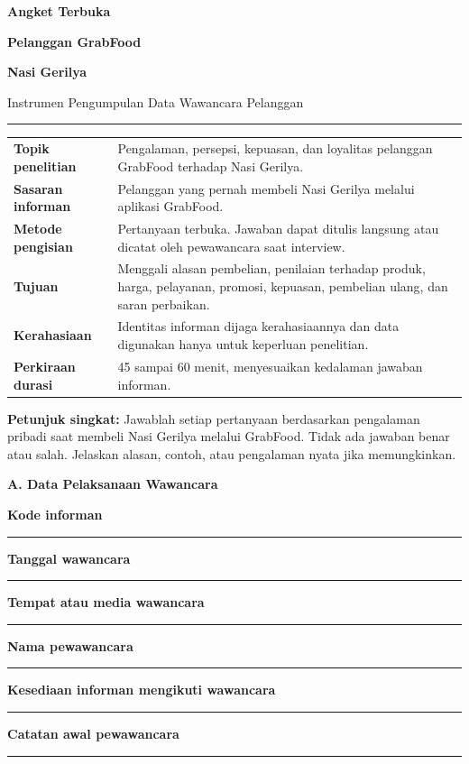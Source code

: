 \documentclass[11pt,a4paper]{article}
\newcommand{\sectionbar}[1]{%
  \Needspace{4\baselineskip}
  \vspace{5mm}
  \noindent\colorbox{Soft}{%
    \parbox{\dimexpr\linewidth-2\fboxsep\relax}{%
      \large\bfseries\textcolor{Primary}{#1}
    }%
  }\par\vspace{2mm}
}
\newcommand{\widefield}[1]{%
  \Needspace{4\baselineskip}
  \textbf{#1}\par
  \noindent\textcolor{LineGray}{\rule{\linewidth}{0.35pt}}\par\vspace{4mm}
}
\begin{document}
\begin{titlepage}
\thispagestyle{empty}
\vspace*{10mm}
{\Huge\bfseries\textcolor{Primary}{Angket Terbuka}}\par
{\Huge\bfseries\textcolor{Primary}{Pelanggan GrabFood}}\par
{\Huge\bfseries\textcolor{Primary}{Nasi Gerilya}}\par
\vspace{3mm}
{\Large\textcolor{Accent}{Instrumen Pengumpulan Data Wawancara Pelanggan}}\par
\vspace{7mm}
\textcolor{Accent}{\rule{0.92\linewidth}{1.4pt}}\par
\vspace{10mm}

\begin{tabularx}{\linewidth}{>{\bfseries\color{Primary}}p{37mm} Y}
Topik penelitian & Pengalaman, persepsi, kepuasan, dan loyalitas pelanggan GrabFood terhadap Nasi Gerilya.\\
Sasaran informan & Pelanggan yang pernah membeli Nasi Gerilya melalui aplikasi GrabFood.\\
Metode pengisian & Pertanyaan terbuka. Jawaban dapat ditulis langsung atau dicatat oleh pewawancara saat interview.\\
Tujuan & Menggali alasan pembelian, penilaian terhadap produk, harga, pelayanan, promosi, kepuasan, pembelian ulang, dan saran perbaikan.\\
Kerahasiaan & Identitas informan dijaga kerahasiaannya dan data digunakan hanya untuk keperluan penelitian.\\
Perkiraan durasi & 45 sampai 60 menit, menyesuaikan kedalaman jawaban informan.\\
\end{tabularx}

\vfill
\colorbox{Soft}{%
  \parbox{\dimexpr\linewidth-2\fboxsep\relax}{%
    \raggedright
    \textbf{\textcolor{Primary}{Petunjuk singkat:}}
    Jawablah setiap pertanyaan berdasarkan pengalaman pribadi saat membeli Nasi Gerilya melalui GrabFood. Tidak ada jawaban benar atau salah. Jelaskan alasan, contoh, atau pengalaman nyata jika memungkinkan.
  }%
}
\vspace*{8mm}
\end{titlepage}

\sectionbar{A. Data Pelaksanaan Wawancara}
\widefield{Kode informan}
\widefield{Tanggal wawancara}
\widefield{Tempat atau media wawancara}
\widefield{Nama pewawancara}
\widefield{Kesediaan informan mengikuti wawancara}
\widefield{Catatan awal pewawancara}
\end{document}
